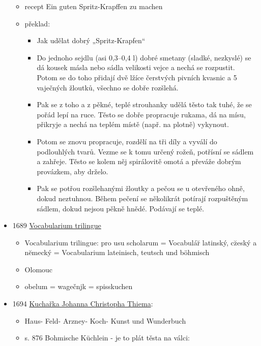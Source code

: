 \begin{itemize}
  \begin{itemize}
  \tightlist
  \item
    recept Ein guten Spritz-Krapffen zu machen
  \item
    překlad:

    \begin{itemize}
    \tightlist
    \item
      Jak udělat dobrý „Spritz-Krapfen``
    \item
      Do jednoho sejdlu (asi 0,3--0,4 l) dobré smetany (sladké,
      nezkyslé) se dá kousek másla nebo sádla velikosti vejce a nechá se
      rozpustit. Potom se do toho přidají dvě lžíce čerstvých pivních
      kvasnic a 5 vaječných žloutků, všechno se dobře rozšlehá.
    \item
      Pak se z toho a z pěkné, teplé strouhanky udělá těsto tak tuhé, že
      se pořád lepí na ruce. Těsto se dobře propracuje rukama, dá na
      mísu, přikryje a nechá na teplém místě (např. na plotně) vykynout.
    \item
      Potom se znovu propracuje, rozdělí na tři díly a vyválí do
      podlouhlých tvarů. Vezme se k tomu určený rožeň, potřísní se
      sádlem a zahřeje. Těsto se kolem něj spirálovitě omotá a převáže
      dobrým provázkem, aby drželo.
    \item
      Pak se potřou rozšlehanými žloutky a pečou se u otevřeného ohně,
      dokud neztuhnou. Během pečení se několikrát potírají rozpuštěným
      sádlem, dokud nejsou pěkně hnědé. Podávají se teplé.
    \end{itemize}
  \end{itemize}
\item
  1689
  \href{https://www.digitale-sammlungen.de/view/bsb11105115?page=42\%2C43}{Vocabularium
  trilingue}

  \begin{itemize}
  \tightlist
  \item
    Vocabularium trilingue: pro usu scholarum = Vocabulár̆ latinský,
    cz̆eský a nĕmecký = Vocabularium lateinisch, teutsch und böhmisch
  \item
    Olomouc
  \item
    obelum = wagečnjk = spisskuchen
  \end{itemize}
\item
  1694
  \href{https://books.google.cz/books?id=PytAAAAAcAAJ&hl=cs&pg=PA876\#v=onepage&q&f=false}{Kuchařka
  Johanna Christopha Thiema}:

  \begin{itemize}
  \tightlist
  \item
    Haus- Feld- Arzney- Koch- Kunst und Wunderbuch
  \item
    s. 876 Bohmische Küchlein - je to plát těsta na válci:


\end{itemize}
\end{itemize}
